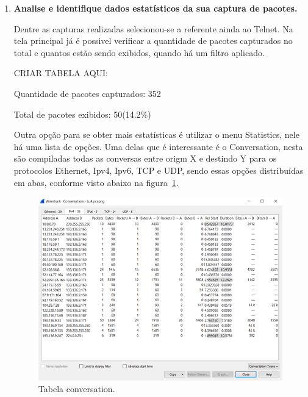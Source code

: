 \documentclass{llncs}
\begin{document}
\begin{enumerate}[\textbf{d)}]
  \item \textbf{Analise e identifique dados estatísticos da sua captura de pacotes.}

  \begin{flushleft}
    Dentre as capturas realizadas selecionou-se a referente ainda ao Telnet. Na tela principal já é possivel verificar a quantidade de pacotes capturados no total e quantos estão sendo exibidos, quando há um filtro aplicado.
    \par CRIAR TABELA AQUI:
    \par Quantidade de pacotes capturados: 352
    \par Total de pacotes exibidos: 50(14.2\%)
    \par Outra opção para se obter mais estatísticas é utilizar o menu Statistics, nele há uma lista de opções. Uma delas que é interessante é o Conversation, nesta são compiladas todas as conversas entre origm X e destindo Y para os protocolos Ethernet, Ipv4, Ipv6, TCP e UDP, sendo essas opções distribuídas em abas, conforme visto abaixo na figura~\ref{fig:conversation01}.
    \begin{figure}[h]
      \includegraphics[scale=0.65]{conversation01.png}
      \centering
      \caption{Tabela conversation.}
      \label{fig:conversation01}
    \end{figure}
  \end{flushleft}
\end{enumerate}
\end{document}

